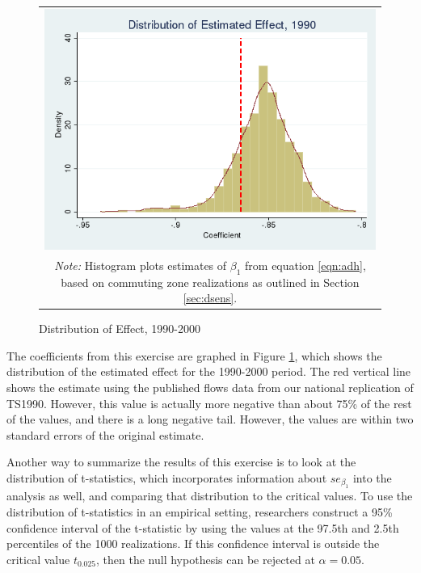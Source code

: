\begin{figure}\centering
\caption{Distribution of Effect, 1990-2000 \label{fig:1990dist}}
\begin{tabular}{c}
\includegraphics[scale=.5]{./figures/1990_distribution.png}\\
\multicolumn{1}{p{4.5in}}{\footnotesize \emph{Note:} Histogram plots estimates of $\beta_1$ from equation \ref{eqn:adh}, based on commuting zone realizations as outlined in Section \ref{sec:dsens}.}
\end{tabular}
\end{figure}

 The coefficients from this exercise are graphed in Figure \ref{fig:1990dist}, which shows the distribution of the estimated effect for the 1990-2000 period. The red vertical line shows the estimate using the published flows data from our national replication of TS1990. However, this value is actually more negative than about 75\% of the rest of the values, and there is a long negative tail. However, the values are within two standard errors of the original estimate.

Another way to summarize the results of this exercise is to look at the distribution of t-statistics, which incorporates information about $se_{\beta_1}$ into the analysis as well, and comparing that distribution to the critical values. To use the distribution of t-statistics in an empirical setting, researchers construct a 95\% confidence interval of the t-statistic by using the values at the 97.5th and 2.5th percentiles of the 1000 realizations. If this confidence interval is outside the critical value $t_{0.025}$, then the null hypothesis can be rejected at $\alpha = 0.05$. 

